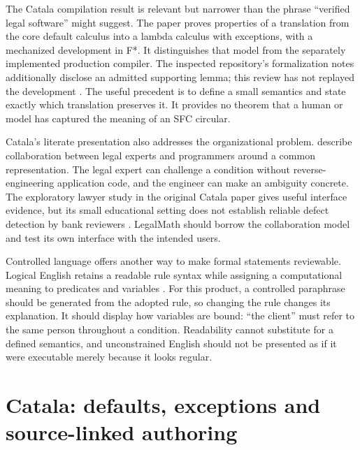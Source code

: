 
The Catala compilation result is relevant but narrower than the phrase
``verified legal software'' might suggest. The paper proves properties of a
translation from the core default calculus into a lambda calculus with exceptions,
with a mechanized development in F*. It distinguishes that model from the
separately implemented production compiler. The inspected repository's
formalization notes additionally disclose an admitted supporting lemma; this
review has not replayed the development \citep[sec.~4]{catala2021,catalacode}.
The useful precedent is to define a small semantics and state exactly which
translation preserves it. It provides no theorem that a human or model has
captured the meaning of an SFC circular.

Catala's literate presentation also addresses the organizational problem.
\citet[sec.~4.2]{huttner2022} describe collaboration between legal experts and
programmers around a common representation. The legal expert can challenge a
condition without reverse-engineering application code, and the engineer can
make an ambiguity concrete. The exploratory lawyer study in the original Catala
paper gives useful interface evidence, but its small educational setting does
not establish reliable defect detection by bank reviewers
\citep[sec.~6]{catala2021}. LegalMath should borrow the collaboration model and
test its own interface with the intended users.

Controlled language offers another way to make formal statements reviewable.
Logical English retains a readable rule syntax while assigning a computational
meaning to predicates and variables \citep{logicalenglish2023}. For this product,
a controlled paraphrase should be generated from the adopted rule, so changing
the rule changes its explanation. It should display how variables are bound:
``the client'' must refer to the same person throughout a condition. Readability
cannot substitute for a defined semantics, and unconstrained English should not
be presented as if it were executable merely because it looks regular.

\section{Catala: defaults, exceptions and source-linked authoring}
\label{merge:M04:03}

